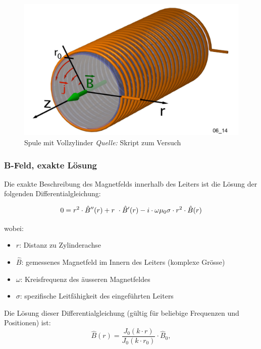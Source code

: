 \begin{figure}[th!]
    \centering
    \includegraphics[width=.5\textwidth]{images/spule-vollzylinder.png}
    \caption{Spule mit Vollzylinder \emph{Quelle:} Skript zum Versuch~\cite{ref:looser:skineffekt}}
\end{figure}


\subsubsection{B-Feld, exakte L\"osung}
\label{sec:arbgru:subsec:vollzylinder:bFeldexakt}


Die exakte Beschreibung des Magnetfelds innerhalb des Leiters ist die L\"osung der
folgenden Differentialgleichung:

\begin{equation}
    \label{eq:vollzylinder:DLG}
        0 = r^2 \cdot \hat{B}'' (r) + r\ \cdot \hat{B}' (r) - i \cdot \omega\mu_0\sigma \cdot r^2 \cdot \hat{B} (r) \\
\end{equation}

wobei:

\begin{itemize}
    \item[]
        $r$: Distanz zu Zylinderachse
    \item[]
        $\hat{B}$: gemessenes Magnetfeld im Innern des Leiters (komplexe Gr\"osse)
    \item[]
        $\omega$: Kreisfrequenz des \"ausseren Magnetfeldes
    \item[]
        $\sigma$: spezifische Leitf\"ahigkeit des eingef\"uhrten Leiters
\end{itemize}


Die L\"osung dieser Differentialgleichung (g\"ultig f\"ur beliebige Frequenzen und Positionen) ist:
\begin{equation}
    \label{eq:vollzylinder:bFeldExact}
    \hat{B} (r) = \frac{J_0 (k \cdot r)}{J_0 (k \cdot r_0)} \cdot \hat{B}_0,
\end{equation}

